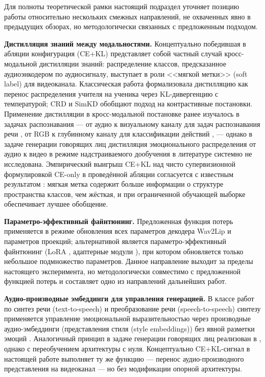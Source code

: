 \documentclass[a4paper, 12pt, oneside, openany]{article}
\begin{document}
Для полноты теоретической рамки настоящий подраздел уточняет позицию работы относительно нескольких смежных направлений, не охваченных явно в предыдущих обзорах, но методологически связанных с предложенным подходом.

\textbf{Дистилляция знаний между модальностями.} Концептуально победившая в абляции конфигурация (CE+KL) представляет собой частный случай кросс-модальной дистилляции знаний: распределение классов, предсказанное аудиоэнкодером по аудиосигналу, выступает в роли <<мягкой метки>> (soft label) для видеоканала. Классическая работа \cite{hinton2015distillation} формализовала дистилляцию как перенос распределения учителя на ученика через KL-дивергенцию с температурой; CRD \cite{tian2020crd} и SimKD \cite{chen2022simkd} обобщают подход на контрастивные постановки. Применение дистилляции в кросс-модальной постановке ранее изучалось в задачах распознавания --- от аудио к визуальному каналу для задач распознавания речи \cite{afouras2018}, от RGB к глубинному каналу для классификации действий \cite{garcia2018}, --- однако в задаче генерации говорящих лиц дистилляция эмоционального распределения от аудио к видео в режиме надстраиваемого дообучения в литературе системно не исследована. Эмпирический выигрыш CE+KL над чисто супервизионной формулировкой CE-only в проведённой абляции согласуется с известным результатом \cite{hinton2015distillation}: мягкая метка содержит больше информации о структуре пространства классов, чем жёсткая, и при ограниченной обучающей выборке обеспечивает лучшее обобщение.

\textbf{Параметро-эффективный файнтюнинг.} Предложенная функция потерь применяется в режиме обновления всех параметров декодера Wav2Lip и параметров проекций; альтернативой является параметро-эффективный файнтюнинг (LoRA \cite{hu2022lora}, адаптерные модули \cite{houlsby2019adapters}), при котором обновляется только небольшое подмножество параметров. Данное направление выходит за пределы настоящего эксперимента, но методологически совместимо с предложенной функцией потерь и составляет одно из направлений дальнейших работ.

\textbf{Аудио-производные эмбеддинги для управления генерацией.} В классе работ по синтез речи (text-to-speech) и преобразование речи (speech-to-speech) синтезу применяется управление эмоциональной выразительностью через производные аудио-эмбеддинги (представления стиля (style embeddings)) без явной разметки эмоций \cite{wang2018tacotrongst}. Аналогичный принцип в задаче генерации говорящих лиц реализован в \cite{shen2024emotalker}, однако с переобучением архитектуры с нуля. Концептуально CE+KL-сигнал в настоящей работе выполняет ту же функцию --- перенос аудио-производного представления на видеоканал --- но без модификации опорной архитектуры.
\end{document}
